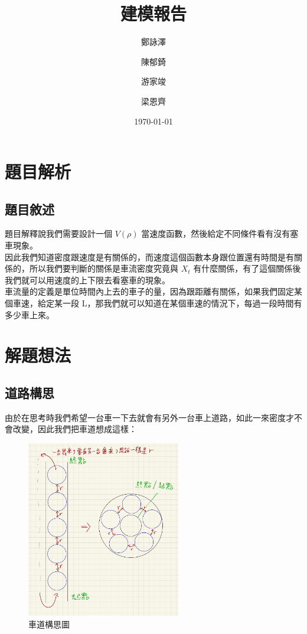 \documentclass[a4paper,12pt]{report}
\title{建模報告}
\author{鄭詠澤\and 陳郁錡\and 游家竣\and 梁恩齊}
\date{\today}
\begin{document}
\begin{CJK*}{UTF8}{bkai}
\maketitle
\tableofcontents
\chapter{題目解析}

\section{題目敘述}

題目解釋說我們需要設計一個 $V(\rho)$ 當速度函數，然後給定不同條件看有沒有塞車現象。\\

因此我們知道密度跟速度是有關係的，而速度這個函數本身跟位置還有時間是有關係的，所以我們要判斷的關係是車流密度究竟與 $X_t$ 有什麼關係，有了這個關係後我們就可以用速度的上下限去看塞車的現象。\\

車流量的定義是單位時間內上去的車子的量，因為跟距離有關係，如果我們固定某個車速，給定某一段 L，那我們就可以知道在某個車速的情況下，每過一段時間有多少車上來。 

\chapter{解題想法}

\section{道路構思}

由於在思考時我們希望一台車一下去就會有另外一台車上道路，如此一來密度才不會改變，因此我們把車道想成這樣：

\begin{figure}[H] 
\centering 
\includegraphics[width=0.6\textwidth]{11-2} 
\caption{車道構思圖} 
\label{Fig.main2} 
\end{figure}


\end{CJK*}
\end{document}
